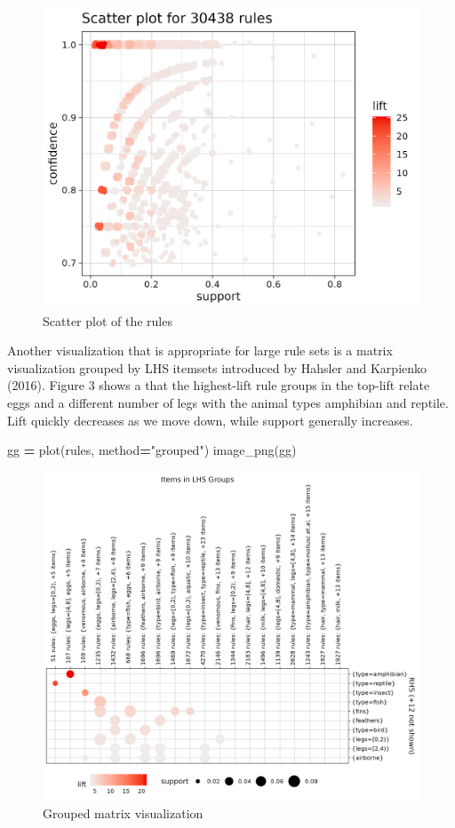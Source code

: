 \documentclass{article}
\newenvironment{Shaded}{\begin{snugshade}}{\end{snugshade}}
\newcommand{\NormalTok}[1]{#1}
\newcommand{\OperatorTok}[1]{\textcolor[rgb]{0.81,0.36,0.00}{\textbf{#1}}}
\newcommand{\StringTok}[1]{\textcolor[rgb]{0.31,0.60,0.02}{#1}}
\begin{document}
\begin{figure}

{\centering \includegraphics[width=0.6\linewidth]{scatter} 

}

\caption{Scatter plot of the rules}\label{fig:scatter}
\end{figure}

Another visualization that is appropriate for large rule sets is a
matrix visualization grouped by LHS itemsets introduced by Hahsler and
Karpienko (2016). Figure 3 shows a that the highest-lift rule groups in
the top-lift relate eggs and a different number of legs with the animal
types amphibian and reptile. Lift quickly decreases as we move down,
while support generally increases.

\begin{Shaded}
\begin{Highlighting}[]
\NormalTok{gg }\OperatorTok{=}\NormalTok{ plot(rules, method}\OperatorTok{=}\StringTok{"grouped"}\NormalTok{)}
\NormalTok{image\_png(gg)}
\end{Highlighting}
\end{Shaded}

\begin{figure}

{\centering \includegraphics[width=0.8\linewidth]{grouped} 

}

\caption{Grouped matrix visualization}\label{fig:grouped}
\end{figure}
\end{document}
